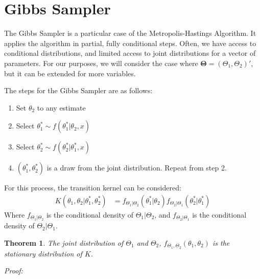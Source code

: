 \documentclass[10pt]{article}
\newtheorem{theorem}{Theorem}
\begin{document}
\section{Gibbs Sampler}
The Gibbs Sampler is a particular case of the Metropolis-Hastings Algorithm. It applies the algorithm in partial, fully conditional steps. Often, we have access to conditional distributions, and limited access to joint distributions for a vector of parameters. For our purposes, we will consider the case where $\boldsymbol{\Theta} = \left( \Theta_{1}, \Theta_{2} \right)'$, but it can be extended for more variables.

\pagebreak
\noindent
The steps for the Gibbs Sampler are as follows:
\begin{enumerate}
    \item Set $\theta_{2}$ to any estimate
    \item Select $\theta_{1}^{*} \sim f \left( \theta_{1}^{*} | \theta_{2}, x \right)$
    \item Select $\theta_{2}^{*} \sim f \left( \theta_{2}^{*} | \theta_{1}^{*}, x \right)$
    \item $\left( \theta_{1}^{*}, \theta_{2}^{*} \right)$ is a draw from the joint distribution. Repeat from step 2.
\end{enumerate}
For this process, the transition kernel can be considered:
\begin{align*}
    K \left( \theta_{1}, \theta_{2} | \theta_{1}^{*}, \theta_{2}^{*}  \right) &= f_{\Theta_{1} | \Theta_{2}} \left( \theta_{1}^{*} | \theta_{2}\right) f_{\Theta_{2} | \Theta_{1}} \left( \theta_{2}^{*} | \theta_{1}^{*} \right)
\end{align*}
Where $f_{\Theta_{1} | \Theta_{2}}$ is the conditional density of $\Theta_{1} | \Theta_{2}$, and $f_{\Theta_{2} | \Theta_{1}}$ is the conditional density of $\Theta_{2} | \Theta_{1}$. 
\begin{theorem}
    The joint distribution of $\Theta_{1}$ and $\Theta_{2}$, $f_{\Theta_{1}, \Theta_{2}} \left( \theta_{1} , \theta_{2}\right)$ is the stationary distribution of $K$.
\end{theorem}
\noindent
\textit{Proof:}
\end{document}
